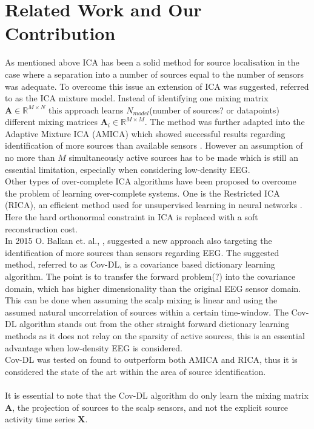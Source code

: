 \section{Related Work and Our Contribution} 
As mentioned above ICA has been a solid method for source localisation in the case where a separation into a number of sources equal to the number of sensors was adequate. To overcome this issue an extension of ICA was suggested, referred to as the ICA mixture model\cite{Balkan2015}. Instead of identifying one mixing matrix $\mathbf{A}\in \mathbb{R}^{M\times N}$ this approach learns $N_{model}$(number of sources? or datapoints) different mixing matrices $\mathbf{A}_i\in \mathbb{R}^{M\times M}$. The method was further adapted into the Adaptive Mixture ICA (AMICA) which showed successful results regarding identification of more sources than available sensors \cite{Palmer2008}. However an assumption of no more than $M$ simultaneously active sources has to be made which is still an essential limitation, especially when considering low-density EEG. 
\\
Other types of over-complete ICA algorithms have been proposed to overcome the problem of learning over-complete systems. One is the Restricted ICA (RICA), an efficient method used for unsupervised learning in neural networks \cite{Le2011}. Here the hard orthonormal constraint in ICA is replaced with a soft reconstruction cost.
\\
In 2015 O. Balkan et. al., \cite{Balkan2015}, suggested a new approach also targeting the identification of more sources than sensors regarding EEG. The suggested method, referred to as Cov-DL, is a covariance based dictionary learning algorithm. The point is to transfer the forward problem(?) into the covariance domain, which has higher dimensionality than the original EEG sensor domain. This can be done when assuming the scalp mixing is linear and using the assumed natural uncorrelation of sources within a certain time-window. The Cov-DL algorithm stands out from the other straight forward dictionary learning methods as it does not relay on the sparsity of active sources, this is an essential advantage when low-density EEG is considered. 
\\
Cov-DL was tested on  found to outperform both AMICA and RICA\cite{Balkan2015}, thus it is considered the state of the art within the area of source identification. 
\\ 
\\
It is essential to note that the Cov-DL algorithm do only learn the mixing matrix $\textbf{A}$, the projection of sources to the scalp sensors, and not the explicit source activity time series $\textbf{X}$.
